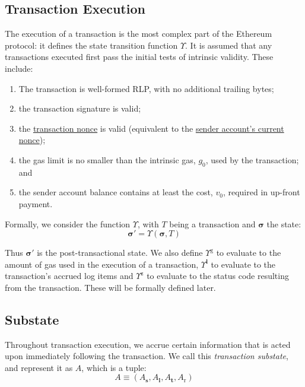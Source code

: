 \documentclass[9pt,oneside]{amsart}
\begin{document}
\begin{multicols}{2}

\section{Transaction Execution} \label{ch:transactions}

The execution of a transaction is the most complex part of the Ethereum protocol: it defines the state transition function \hyperlink{Upsilon_state_transition}{$\Upsilon$}. It is assumed that any transactions executed first pass the initial tests of intrinsic validity. These include:

\begin{enumerate}
\item The transaction is well-formed RLP, with no additional trailing bytes;
\item the transaction signature is valid;
\item the \hyperlink{transaction_nonce}{transaction nonce} is valid (equivalent to the \hyperlink{account_nonce}{sender account's current nonce});
\item the gas limit is no smaller than the intrinsic gas, $g_0$, used by the transaction; and
\item the sender account balance contains at least the cost, $v_0$, required in up-front payment.
\end{enumerate}

Formally, we consider the function \hyperlink{Upsilon_state_transition}{$\Upsilon$}, with $T$ being a transaction and $\boldsymbol{\sigma}$ the state:
\begin{equation}
\boldsymbol{\sigma}' = \Upsilon(\boldsymbol{\sigma}, T)
\end{equation}

Thus $\boldsymbol{\sigma}'$ is the post-transactional state. We also define \hyperlink{tx_total_gas_used_Upsilon_pow_g}{$\Upsilon^{\mathrm{g}}$} to evaluate to the amount of gas used in the execution of a transaction, \hyperlink{tx_logs_Upsilon_pow_l}{$\Upsilon^{\mathbf{l}}$} to evaluate to the transaction's accrued log items and \hyperlink{tx_status_Upsilon_pow_z}{$\Upsilon^{\mathrm{z}}$} to evaluate to the status code resulting from the transaction. These will be formally defined later.

\subsection{Substate}
Throughout transaction execution, we accrue certain information that is acted upon immediately following the transaction. We call this \textit{transaction substate}, and represent it as $A$, which is a tuple:
\begin{equation}
A \equiv (A_{\mathbf{s}}, A_{\mathbf{l}}, A_{\mathbf{t}}, A_{\mathrm{r}})
\end{equation}


\end{multicols}
\end{document}
